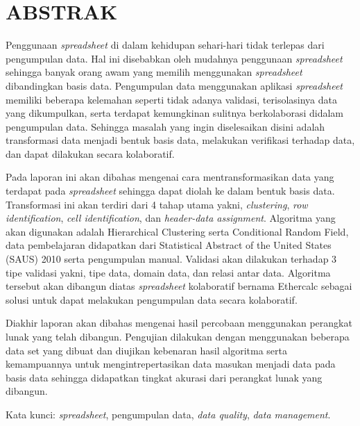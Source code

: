 \clearpage
\chapter*{ABSTRAK}

Penggunaan \textit{spreadsheet} di dalam kehidupan sehari-hari tidak terlepas dari pengumpulan data. Hal ini disebabkan oleh mudahnya penggunaan \textit{spreadsheet} sehingga banyak orang awam yang memilih menggunakan \textit{spreadsheet} dibandingkan basis data. Pengumpulan data menggunakan aplikasi \textit{spreadsheet} memiliki beberapa kelemahan seperti tidak adanya validasi, terisolasinya data yang dikumpulkan, serta terdapat kemungkinan sulitnya berkolaborasi didalam pengumpulan data. Sehingga masalah yang ingin diselesaikan disini adalah transformasi data menjadi bentuk basis data, melakukan verifikasi terhadap data, dan dapat dilakukan secara kolaboratif.

Pada laporan ini akan dibahas mengenai cara mentransformasikan data yang terdapat pada \textit{spreadsheet} sehingga dapat diolah ke dalam bentuk basis data. Transformasi ini akan terdiri dari 4 tahap utama yakni, \textit{clustering}, \textit{row identification}, \textit{cell identification}, dan \textit{header-data assignment}. Algoritma yang akan digunakan adalah Hierarchical Clustering serta Conditional Random Field, data pembelajaran didapatkan dari Statistical Abstract of the United States (SAUS) 2010 serta pengumpulan manual. Validasi akan dilakukan terhadap 3 tipe validasi yakni, tipe data, domain data, dan relasi antar data. Algoritma tersebut akan dibangun diatas \textit{spreadsheet} kolaboratif bernama Ethercalc sebagai solusi untuk dapat melakukan pengumpulan data secara kolaboratif.

Diakhir laporan akan dibahas mengenai hasil percobaan menggunakan perangkat lunak yang telah dibangun. Pengujian dilakukan dengan menggunakan beberapa data set yang dibuat dan diujikan kebenaran hasil algoritma serta kemampuannya untuk mengintrepertasikan data masukan menjadi data pada basis data sehingga didapatkan tingkat akurasi dari perangkat lunak yang dibangun.

Kata kunci: \textit{spreadsheet}, pengumpulan data, \textit{data quality}, \textit{data management}.
\clearpage